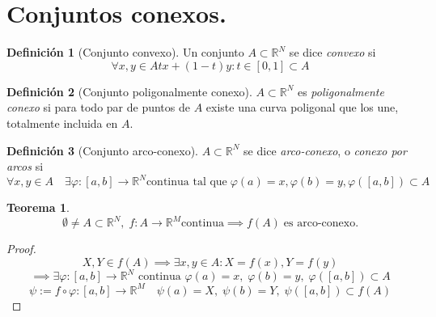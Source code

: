 \documentclass[11pt,a4paper, titlepage]{article}
\theoremstyle{plain}
\newtheorem*{nth}{Teorema}
\theoremstyle{remark}
\theoremstyle{definition}
\newtheorem*{ndef}{Definición}
\begin{document}
\section*{Conjuntos conexos.}
\begin{ndef} [Conjunto convexo]
	Un conjunto $A\subset \mathbb{R}^N$ se dice \emph{convexo} si 
	\[\forall x,y \in A {tx+(1-t)y : t\in [0,1]}\subset A\]
\end{ndef}

\begin{ndef}[Conjunto poligonalmente conexo]
	$A\subset \mathbb{R}^N$ es \emph{poligonalmente conexo} si para todo par de puntos de $A$ existe una curva poligonal que los une, totalmente incluida en $A$.
\end{ndef}

\begin{ndef}[Conjunto arco-conexo]
	$A\subset \mathbb{R}^N$ se dice \emph{arco-conexo}, o \emph{conexo por arcos} si
	\[
		\forall x,y \in A\quad \exists\varphi : [a,b] \longrightarrow \mathbb{R}^N \text{continua tal que}\; \varphi(a) = x, \varphi(b)=y, \varphi([a,b]) \subset A 
	\]
\end{ndef}

\begin{nth}
	\[
	\emptyset \not= A \subset \mathbb{R}^N,\; f:A\longrightarrow \mathbb{R}^M \text{continua} \implies f(A)\; \text{es arco-conexo.}
	\]
\end{nth}

\begin{proof}
	\[X,Y\in f(A) \implies \exists x,y \in A : X=f(x), Y=f(y)\]
	\[\implies \exists\varphi : [a,b]\longrightarrow \mathbb{R}^N \text{ continua } \varphi(a) = x,\; \varphi(b)=y,\; \varphi([a,b]) \subset A\]
	\[\psi := f\circ \varphi : [a,b] \longrightarrow \mathbb{R}^M\quad \psi(a) = X,\; \psi(b)=Y,\; \psi([a,b]) \subset f(A)\]
\end{proof}
\end{document}
